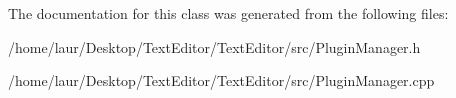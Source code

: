 The documentation for this class was generated from the following files\+:\begin{DoxyCompactItemize}
\item 
/home/laur/\+Desktop/\+Text\+Editor/\+Text\+Editor/src/Plugin\+Manager.\+h\item 
/home/laur/\+Desktop/\+Text\+Editor/\+Text\+Editor/src/Plugin\+Manager.\+cpp\end{DoxyCompactItemize}
